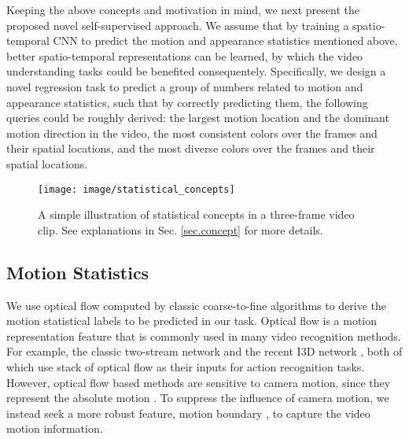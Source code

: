 \documentclass[10pt,twocolumn,letterpaper]{article}
\begin{document}
Keeping the above concepts and motivation in mind, we next present the proposed novel self-supervised approach. 
We assume that by training a spatio-temporal CNN to predict the motion and appearance statistics mentioned above, better spatio-temporal representations can be learned, by which the video understanding tasks could be benefited consequentely.  
Specifically, we design a novel regression task to predict a group of numbers related to motion and appearance statistics, such that by correctly predicting them, the following queries could be roughly derived: the largest motion location and the dominant motion direction in the video, the most consistent colors over the frames and their spatial locations, and the most diverse colors over the frames and their spatial locations.



\begin{figure}[t]
\vspace{-5pt}
\begin{center}
   \texttt{[image: image/statistical\_concepts]}\vspace{-6mm}
\end{center}
   \caption{A simple illustration of statistical concepts in a three-frame video clip. See explanations in Sec. \ref{sec.concept} for more details.
   }
\label{fig:concepts}\vspace{-2mm}
\vspace{-5pt}
\end{figure}

\subsection{Motion Statistics}\label{sec.motionstat}
\label{motion_s}
\vspace{-4pt}

We use optical flow computed by classic coarse-to-fine algorithms \cite{brox2004high} to derive the motion statistical labels to be predicted in our task. 
Optical flow is a motion representation feature that is commonly used in many video recognition methods. 
For example, the classic two-stream network \cite{simonyan2014two} and the recent I3D network \cite{carreira2017quo}, both of which use stack of optical flow as their inputs for action recognition tasks. 
However, optical flow based methods are sensitive to camera motion, since they represent the absolute motion \cite{carreira2017quo, wang2011action}. 
To suppress the influence of camera motion, we instead seek a more robust feature, motion boundary \cite{dalal2006human}, to capture  the video motion information. 
\end{document}
